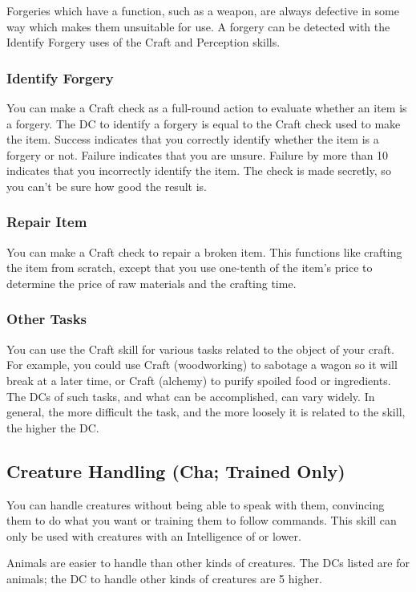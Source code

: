 Forgeries which have a function, such as a weapon, are always defective in some way which makes them unsuitable for use. A forgery can be detected with the Identify Forgery uses of the Craft and Perception skills.

\subsubsection{Identify Forgery}
You can make a Craft check as a full-round action to evaluate whether an item is a forgery. The DC to identify a forgery is equal to the Craft check used to make the item. Success indicates that you correctly identify whether the item is a forgery or not. Failure indicates that you are unsure. Failure by more than 10 indicates that you incorrectly identify the item. The check is made secretly, so you can't be sure how good the result is.

\subsubsection{Repair Item}
You can make a Craft check to repair a broken item. This functions like crafting the item from scratch, except that you use one-tenth of the item's price to determine the price of raw materials and the crafting time.

\subsubsection{Other Tasks}
You can use the Craft skill for various tasks related to the object of your craft. For example, you could use Craft (woodworking) to sabotage a wagon so it will break at a later time, or Craft (alchemy) to purify spoiled food or ingredients. The DCs of such tasks, and what can be accomplished, can vary widely. In general, the more difficult the task, and the more loosely it is related to the skill, the higher the DC.

\subsection{Creature Handling (Cha; Trained Only)}
You can handle creatures without being able to speak with them, convincing them to do what you want or training them to follow commands. This skill can only be used with creatures with an Intelligence of  or lower.

Animals are easier to handle than other kinds of creatures. The DCs listed are for animals; the DC to handle other kinds of creatures are 5 higher.

